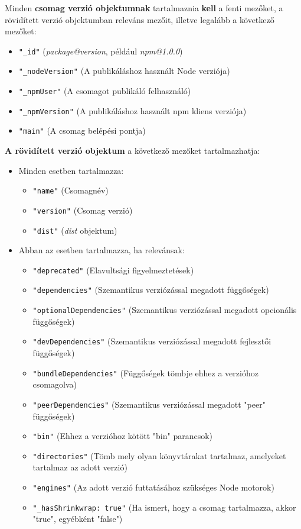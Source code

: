 Minden \textbf{csomag verzió objektumnak} tartalmaznia \textbf{kell} a fenti mezőket, a rövidített verzió objektumban releváns mezőit, illetve legalább a következő mezőket:
 
\begin{itemize}
	\item \texttt{"\_id"} (\emph{package@version}, például \emph{npm@1.0.0})
	\item \texttt{"\_nodeVersion"} (A publikáláshoz használt Node verziója)  
	\item \texttt{"\_npmUser"} (A csomagot publikáló felhasználó)
	\item \texttt{"\_npmVersion"} (A publikáláshoz használt npm kliens verziója)
	\item \texttt{"main"} (A csomag belépési pontja)
\end{itemize}

\textbf{A rövidített verzió objektum} a következő mezőket tartalmazhatja:

\begin{itemize}
	\item Minden esetben tartalmazza:
	\begin{itemize}
		\item \texttt{"name"} (Csomagnév)
		\item \texttt{"version"} (Csomag verzió)
		\item \texttt{"dist"} (\emph{dist} objektum)
	\end{itemize}
	\item Abban az esetben tartalmazza, ha relevánsak:
	\begin{itemize}
		\item \texttt{"deprecated"} (Elavultsági figyelmeztetések)
		\item \texttt{"dependencies"} (Szemantikus verziózással megadott függőségek)
		\item \texttt{"optionalDependencies"} (Szemantikus verziózással megadott opcionális függőségek)
		\item \texttt{"devDependencies"} (Szemantikus verziózással megadott fejlesztői függőségek)
		\item \texttt{"bundleDependencies"} (Függőségek tömbje ehhez a verzióhoz csomagolva)
		\item \texttt{"peerDependencies"} (Szemantikus verziózással megadott "peer" függőségek)
		\item \texttt{"bin"} (Ehhez a verzióhoz kötött "bin" parancsok)
		\item \texttt{"directories"} (Tömb mely olyan könyvtárakat tartalmaz, amelyeket tartalmaz az adott verzió)
		\item \texttt{"engines"} (Az adott verzió futtatásához szükséges Node motorok)
		\item \texttt{"\_hasShrinkwrap: true"} (Ha ismert, hogy a csomag tartalmazza, akkor "true", egyébként "false")
	\end{itemize}
\end{itemize}

